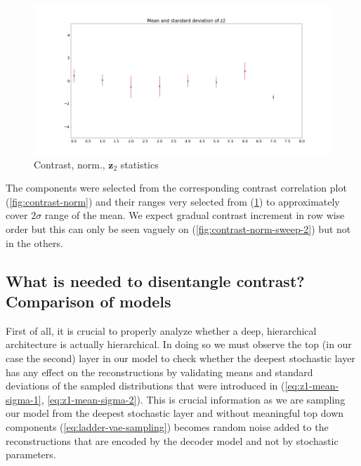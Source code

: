 \documentclass[12pt, english]{article}
\begin{document}
\begin{figure}[H]
    \centering
    \includegraphics[width=.85\linewidth]{sweep/norm_contrast_z2_stats.png} 
    \caption{Contrast, norm., $\bm{z}_2$ statistics} 
    \label{fig:contrast-norm-stats}
\end{figure}

\vspace{4mm}

\par The components were selected from the corresponding contrast correlation plot (\ref{fig:contrast-norm}) and their ranges very selected from (\ref{fig:contrast-norm-stats}) to approximately cover $2\sigma$ range of the mean. We expect gradual contrast increment in row wise order but this can only be seen vaguely on (\ref{fig:contrast-norm-sweep-2}) but not in the others.

\newpage

\subsection{What is needed to disentangle contrast? Comparison of models}

\vspace{5mm}

\par First of all, it is crucial to properly analyze whether a deep, hierarchical architecture is actually hierarchical. In doing so we must observe the top (in our case the second) layer in our model to check whether the deepest stochastic layer has any effect on the reconstructions by validating means and standard deviations of the sampled distributions that were introduced in (\ref{eq:z1-mean-sigma-1}, \ref{eq:z1-mean-sigma-2}). This is crucial information as we are sampling our model from the deepest stochastic layer and without meaningful top down components (\ref{eq:ladder-vae-sampling}) becomes random noise added to the reconstructions that are encoded by the decoder model and not by stochastic parameters.
\end{document}
